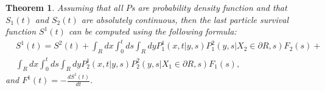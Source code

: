 \documentclass[a4paper,11pt]{amsart}
\newtheorem{theorem}{Theorem}
\theoremstyle{remark}
\begin{document}
  \begin{theorem}
    \label{theo:two}
    Assuming that all $P$s are probability density function and that $S_1(t)$ and $S_2(t)$ are absolutely continuous, then the last particle survival function $S^1(t)$ can be computed using the following formula:
    \begin{equation}
      \label{eq:S1_general}
      \begin{aligned}
        &S^1(t)=S^2(t)+\int_Rdx\int_0^tds \int_Rdy P^1_1(x,t|y,s)P^2_1(y,s|X_2\in \partial R,s)F_{2}(s)+\\
        &\int_Rdx\int_0^tds \int_Rdy P^1_2(x,t|y,s)P^2_2(y,s|X_1\in \partial R,s)F_{1}(s),
      \end{aligned}
    \end{equation}
    and $F^1(t)=-\frac{dS^1(t)}{dt}$.
  \end{theorem}
\end{document}
